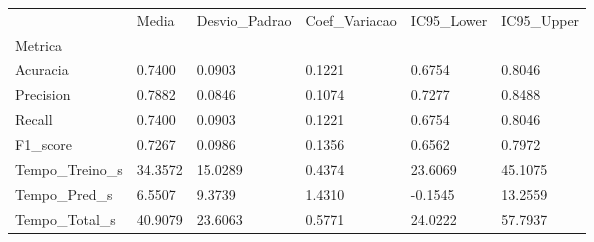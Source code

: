 \begin{tabular}{llllll}
\toprule
 & Media & Desvio_Padrao & Coef_Variacao & IC95_Lower & IC95_Upper \\
Metrica &  &  &  &  &  \\
\midrule
Acuracia & 0.7400 & 0.0903 & 0.1221 & 0.6754 & 0.8046 \\
Precision & 0.7882 & 0.0846 & 0.1074 & 0.7277 & 0.8488 \\
Recall & 0.7400 & 0.0903 & 0.1221 & 0.6754 & 0.8046 \\
F1_score & 0.7267 & 0.0986 & 0.1356 & 0.6562 & 0.7972 \\
Tempo_Treino_s & 34.3572 & 15.0289 & 0.4374 & 23.6069 & 45.1075 \\
Tempo_Pred_s & 6.5507 & 9.3739 & 1.4310 & -0.1545 & 13.2559 \\
Tempo_Total_s & 40.9079 & 23.6063 & 0.5771 & 24.0222 & 57.7937 \\
\bottomrule
\end{tabular}
